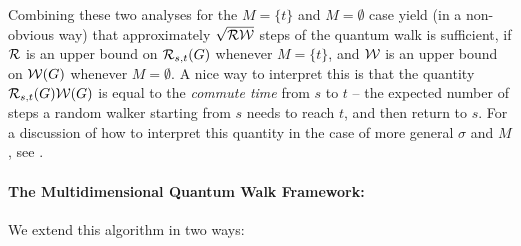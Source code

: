 \documentclass{article}
\renewcommand{\>}{\rangle}
\newcommand{\<}{\langle}
\renewcommand{\(}{\left(}
\renewcommand{\)}{\right)}
\begin{document}
Combining these two analyses for the $M=\{t\}$ and $M=\emptyset$ case yield (in a non-obvious way) that approximately $\sqrt{\cal RW}$ steps of the quantum walk is sufficient, if ${\cal R}$ is an upper bound on ${\cal R}_{s,t}(G)$ whenever $M=\{t\}$, and ${\cal W}$ is an upper bound on ${\cal W}(G)$ whenever $M=\emptyset$. A nice way to  interpret this is that the quantity ${\cal R}_{s,t}(G){\cal W}(G)$ is equal to the \emph{commute time} from $s$ to $t$ -- the expected number of steps a random walker starting from $s$ needs to reach $t$, and then return to $s$. For a discussion of how to interpret this quantity in the case of more general $\sigma$ and $M$, see \cite{apers2019UnifiedFrameworkQWSearch}. 

\paragraph{The Multidimensional Quantum Walk Framework:} We extend this algorithm in two ways:
\end{document}
